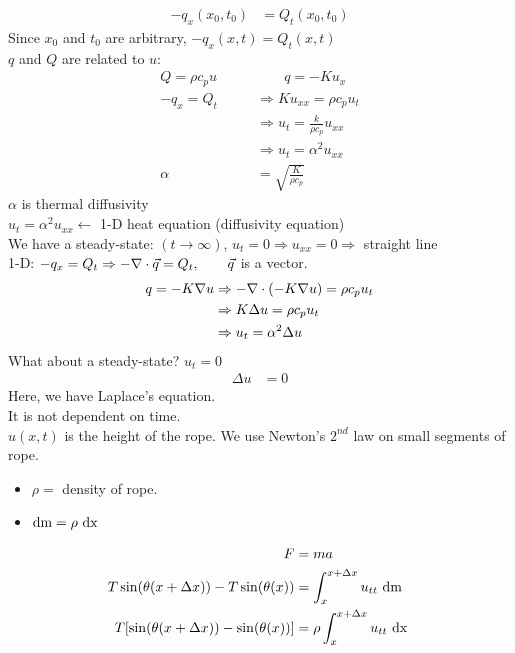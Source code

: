 \documentclass{article}
\begin{document}
\begin{align}
  -q_x(x_0, t_0) & = Q_t(x_0, t_0)
\end{align}
Since $x_0$ and $t_0$ are arbitrary, $-q_x(x, t) = Q_t(x, t)$\\
$q$ and $Q$ are related to $u$:
\begin{align}
  Q = \rho c_p u \qquad & \qquad q = -Ku_x\\
  -q_x = Q_t & \Rightarrow Ku_{xx} = \rho c_p u_t\\
  & \Rightarrow u_t = \frac{k}{\rho c_p} u_{xx}\\
  & \Rightarrow u_t = \alpha^2 u_{xx}\\
  \alpha & = \sqrt{\frac{K}{\rho c_p}}
\end{align}
$\alpha$ is thermal diffusivity\\
$u_t = \alpha^2 u_{xx} \leftarrow$ 1-D heat equation (diffusivity equation)\\
We have a steady-state: $(t \rightarrow \infty)$, $u_t = 0 \Rightarrow u_{xx} = 0 \Rightarrow $ straight line\\
1-D: $-q_x = Q_t \Rightarrow -\nabla \cdot \vec q = Q_t, \qquad \vec q$ is a vector.
\begin{align}
  q = -K \nabla u & \Rightarrow - \nabla \cdot (-K \nabla u) = \rho c_p u_t\\
  & \Rightarrow K \Delta u = \rho c_p u_t\\
  & \Rightarrow u_t = \alpha^2 \Delta u
\end{align}
What about a steady-state? $u_t = 0$
\begin{align}
  \Delta u & = 0
\end{align}
Here, we have Laplace's equation.\\
\note It is not dependent on time.\\
$u(x, t)$ is the height of the rope. We use Newton's $2^{nd}$ law on small segments of rope.
\begin{itemize}
  \item $\rho = $ density of rope.
  \item $\text{dm} = \rho \text{ dx }$
\end{itemize}
\begin{align}
  F & = ma\\
  T \sin(\theta(x + \Delta x)) - T \sin(\theta(x)) & = \int^{x + \Delta x}_x u_{tt} \text{ dm}\\
  T[ \sin(\theta (x + \Delta x)) - \sin(\theta (x))] & = \rho \int^{x + \Delta x}_{x} u_{tt} \text{ dx }
\end{align}
\end{document}
